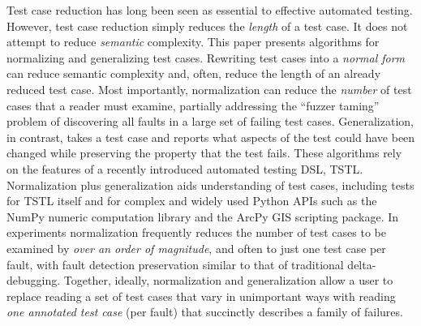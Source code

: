 Test case reduction has long been seen as essential to effective automated testing.  However, test case reduction simply reduces the \emph{length} of a test case.  It does not attempt to reduce \emph{semantic} complexity.  This paper presents algorithms for normalizing and generalizing test cases.  Rewriting test cases into a \emph{normal form} can reduce semantic complexity and, often, reduce the length of an already reduced test case.  Most importantly, normalization can reduce the \emph{number} of test cases that a reader must examine, partially addressing the ``fuzzer taming'' problem of discovering all faults in a large set of failing test cases.  Generalization, in contrast, takes a test case and reports what aspects of the test could have been changed while preserving the property that the test fails.  These algorithms rely on the features of a recently introduced automated testing DSL, TSTL.  Normalization plus generalization aids understanding of test cases, including tests for TSTL itself and for complex and widely used Python APIs such as the NumPy numeric computation library and the ArcPy GIS scripting package.  In experiments normalization frequently reduces the number of test cases to be examined by \emph{over an order of magnitude}, and often to just one test case per fault, with fault detection preservation similar to that of traditional delta-debugging.  Together, ideally, normalization and generalization allow a user to replace reading a set of test cases that vary in unimportant ways with reading \emph{one annotated test case} (per fault) that succinctly describes a family of failures. 